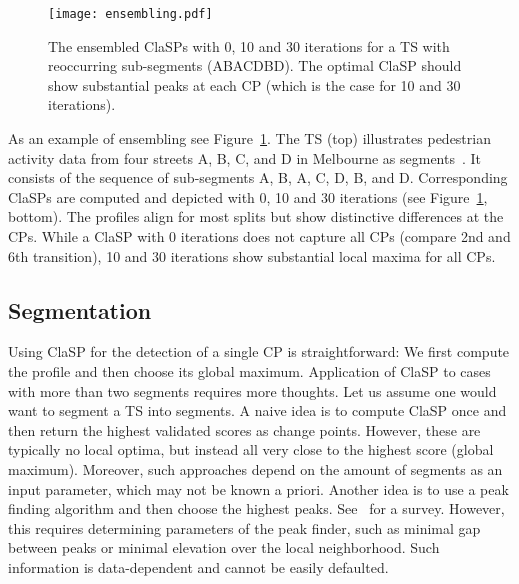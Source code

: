 \documentclass[pdflatex,sn-basic]{sn-jnl}
\begin{document}
\begin{figure}[t]
	\texttt{[image: ensembling.pdf]}
	\caption{The ensembled ClaSPs with 0, 10 and 30 iterations for a TS with reoccurring sub-segments (ABACDBD). The optimal ClaSP should show substantial peaks at each CP (which is the case for 10 and 30 iterations). \label{fig:ClaSP_ensembling}
	}
\end{figure}

As an example of ensembling see Figure~\ref{fig:ClaSP_ensembling}. The TS (top) illustrates pedestrian activity data from four streets A, B, C, and D in Melbourne as segments~\citep{UCRClassification}. It consists of the sequence of sub-segments A, B, A, C, D, B, and D. Corresponding ClaSPs are computed and depicted with 0, 10 and 30 iterations (see Figure~\ref{fig:ClaSP_ensembling}, bottom). The profiles align for most splits but show distinctive differences at the CPs. While a ClaSP with 0 iterations does not capture all CPs (compare 2nd and 6th transition), 10 and 30 iterations show substantial local maxima for all CPs.


\subsection{Segmentation}\label{sec:segmentation_alg}

Using ClaSP for the detection of a single CP is straightforward: We first compute the profile and then choose its global maximum. Application of ClaSP to cases with more than two segments requires more thoughts. Let us assume one would want to segment a TS  into  segments. A naive idea is to compute ClaSP once and then return the  highest validated scores as change points. However, these are typically no local optima, but instead all very close to the highest score (global maximum). Moreover, such approaches depend on the amount of segments  as an input parameter, which may not be known a priori. Another idea is to use a peak finding algorithm and then choose the  highest peaks. See~\citep{Yang2008ComparisonOP} for a survey. However, this requires determining parameters of the peak finder, such as minimal gap between peaks or minimal elevation over the local neighborhood. Such information is data-dependent and cannot be easily defaulted.
\end{document}
